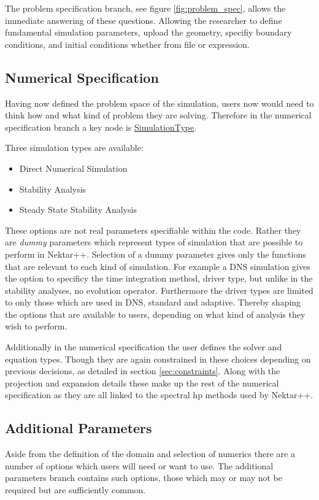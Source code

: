\documentclass[11pt, a4paper]{report}
\begin{document}
The problem specification branch, see figure \ref{fig:problem_spec}, allows the immediate answering of these questions. Allowing the researcher to define fundamental simulation parameters, upload the geometry, specifiy boundary conditions, and initial conditions whether from file or expression.	

\subsection{Numerical Specification}
Having now defined the problem space of the simulation, users now would need to think how and what kind of problem they are solving. Therefore in the numerical specification branch a key node is \url{SimulationType}.

Three simulation types are available:
\begin{itemize}
\item Direct Numerical Simulation
\item Stability Analysis
\item Steady State Stability Analysis
\end{itemize}

These options are not real parameters specifiable within the code. Rather they are \textit{dummy} parameters which represent types of simulation that are possible to perform in Nektar++. Selection of a dummy parameter gives only the functions that are relevant to each kind of simulation. For example a DNS simulation gives the option to specificy the time integration method, driver type, but unlike in the stability analyses, no evolution operator. Furthermore the driver types are limited to only those which are used in DNS, standard and adaptive. Thereby shaping the options that are available to users, depending on what kind of analysis they wish to perform.

Additionally in the numerical specification the user defines the solver and equation types. Though they are again constrained in these choices depending on previous decisions, as detailed in section \ref{sec:constraints}. Along with the projection and expansion details these make up the rest of the numerical specification as they are all linked to the spectral hp methods used by Nektar++.

\subsection{Additional Parameters}
Aside from the definition of the domain and selection of numerics there are a number of options which users will need or want to use. The additional parameters branch contains such options, those which may or may not be required but are sufficiently common.
\end{document}
